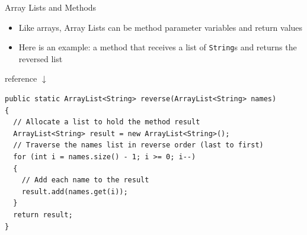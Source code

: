 \documentclass[aspectratio=43,10pt,t]{beamer}
\newcommand{\code}[1]{\texttt{#1}}
\newcommand{\ptag}[1]{{\setlength{\fboxsep}{1.5pt}\colorbox{callout}{\scriptsize #1}}}
\begin{document}
\begin{frame}[fragile]{Array Lists and Methods}
  \begin{itemize}
    \item Like arrays, Array Lists can be method parameter variables and return values
    \item Here is an example: a method that receives a list of \code{String}s and returns the reversed list
  \end{itemize}
  \hfill\ptag{reference $\downarrow$}\hspace*{0.05\linewidth}
\begin{lstlisting}[basicstyle=\ttfamily\scriptsize]
public static ArrayList<String> reverse(ArrayList<String> names)
{
  // Allocate a list to hold the method result
  ArrayList<String> result = new ArrayList<String>();
  // Traverse the names list in reverse order (last to first)
  for (int i = names.size() - 1; i >= 0; i--)
  {
    // Add each name to the result
    result.add(names.get(i));
  }
  return result;
}
\end{lstlisting}
\end{frame}
\end{document}
